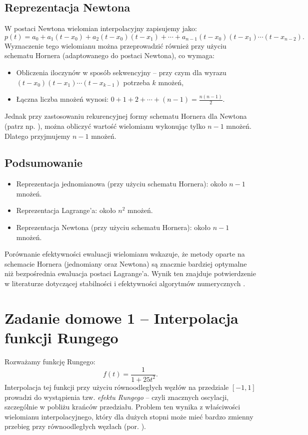 \documentclass{article}
\begin{document}
\subsection{Reprezentacja Newtona}
W postaci Newtona wielomian interpolacyjny zapisujemy jako:
\[
p(t)=a_0+a_1(t-x_0)+a_2(t-x_0)(t-x_1)+\cdots+a_{n-1}(t-x_0)(t-x_1)\cdots(t-x_{n-2}).
\]
Wyznaczenie tego wielomianu można przeprowadzić również przy użyciu schematu Hornera (adaptowanego do postaci Newtona), co wymaga:
\begin{itemize}
    \item Obliczenia iloczynów w sposób sekwencyjny – przy czym dla wyrazu \( (t-x_0)(t-x_1)\cdots(t-x_{k-1}) \) potrzeba \( k \) mnożeń,
    \item Łączna liczba mnożeń wynosi: \( 0+1+2+\cdots+(n-1)=\frac{n(n-1)}{2} \).
\end{itemize}
Jednak przy zastosowaniu rekurencyjnej formy schematu Hornera dla Newtona (patrz np. \cite{Rycerz}), można obliczyć wartość wielomianu wykonując tylko \( n-1 \) mnożeń. Dlatego przyjmujemy $n-1$ mnożeń.

\subsection{Podsumowanie}
\begin{itemize}
    \item Reprezentacja jednomianowa (przy użyciu schematu Hornera): około \( n-1 \) mnożeń.
    \item Reprezentacja Lagrange’a: około \( n^2 \) mnożeń.
    \item Reprezentacja Newtona (przy użyciu schematu Hornera): około \( n-1 \) mnożeń.
\end{itemize}

Porównanie efektywności ewaluacji wielomianu wskazuje, że metody oparte na schemacie Hornera (jednomiany oraz Newtona) są znacznie bardziej optymalne niż bezpośrednia ewaluacja postaci Lagrange’a. Wynik ten znajduje potwierdzenie w literaturze dotyczącej stabilności i efektywności algorytmów numerycznych \cite{Higham2002,Goldberg1991}.


\section{Zadanie domowe 1 -- Interpolacja funkcji Rungego}
Rozważamy funkcję Rungego:
\begin{equation}
    f(t)=\frac{1}{1+25t^2}.
\end{equation}
Interpolacja tej funkcji przy użyciu równoodległych węzłów na przedziale $[-1,1]$ prowadzi do wystąpienia tzw. \emph{efektu Rungego} – czyli znacznych oscylacji, szczególnie w pobliżu krańców przedziału. Problem ten wynika z właściwości wielomianu interpolacyjnego, który dla dużych stopni może mieć bardzo zmienny przebieg przy równoodległych węzłach (por. \cite{Higham2002}).
\end{document}
